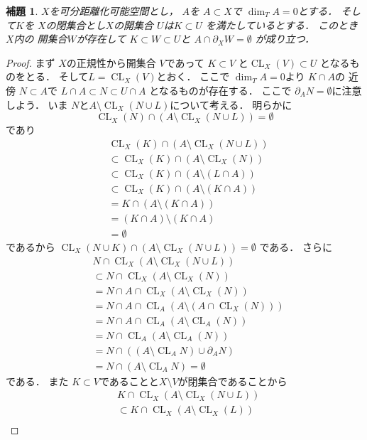 \documentclass[leqno, a4paper, 12pt]{jsarticle}
\newtheorem{lem}[thm]{補題}
\DeclareMathOperator{\cl}{CL}
\numberwithin{equation}{section}
\begin{document}
\begin{lem}\label{lem:jojo111}
$X$を可分距離化可能空間とし，
$A$を
$A\subset X$で
$\dim_{T}A=0$とする．
そして$K$を
$X$の閉集合とし$X$の開集合
$U$は$K\subset U$
を満たしているとする．
このとき$X$内の
開集合$W$が存在して
$K\subset W\subset U$と
$A\cap \partial_{X} W=\emptyset$
が成り立つ．
\end{lem}
\begin{proof}
まず
$X$の正規性から開集合
$V$であって
$K\subset V$
と$\cl_{X}(V)\subset U$
となるものをとる．
そして$L=\cl_{X}(V)$とおく．
ここで
$\dim_{T}A=0$より
$K\cap A$の
近傍
$N\subset A$で
$L\cap A\subset N\subset U\cap A$
となるものが存在する．
ここで
$\partial_{A}N=\emptyset$に注意しよう．
いま
$N$と$A\setminus \cl_{X}(N\cup L)$について考える．
明らかに
\[
\cl_{X}(N)\cap (A\setminus \cl_{X}(N\cup L))=\emptyset
\]
であり
\begin{align*}
&\cl_{X}(K)\cap (A\setminus \cl_{X}(N\cup L))\\
&\subset
\cl_{X}(K)\cap (A\setminus \cl_{X}(N))
 \\
&\subset \cl_{X}(K)\cap (A\setminus (L\cap A))\\
&\subset \cl_{X}(K)\cap(A\setminus (K\cap A))\\
&=K\cap (A\setminus (K\cap A))\\
&=(K\cap A)\setminus (K\cap A)\\
&=\emptyset
\end{align*}
であるから
$\cl_{X}(N\cup K)\cap (A\setminus \cl_{X}(N\cup L))=\emptyset$
である．
さらに
\begin{align*}
&N\cap 
\cl_{X}(A\setminus \cl_{X}(N\cup L))\\
&\subset N\cap 
\cl_{X}(A\setminus \cl_{X}(N))\\
&=
N \cap A\cap \cl_{X}(A\setminus \cl_{X}(N))
\\
&=
N\cap A\cap \cl_{A}(A\setminus (A\cap \cl_{X}(N)))
\\
&=
N\cap 
A\cap \cl_{A}(A\setminus \cl_{A}(N))\\
&=
N\cap 
\cl_{A}(A\setminus \cl_{A}(N))
\\
&=
N\cap (
(A\setminus \cl_{A} N)\cup \partial_{A} N)
\\
&=
N\cap (A\setminus \cl_{A} N)=\emptyset
\end{align*}
である．
また
$K\subset V$であることと$X\setminus V$が閉集合であることから
\begin{align*}
&K\cap 
\cl_{X}(A\setminus \cl_{X}(N\cup L))\\
&\subset K\cap \cl_{X}(A\setminus \cl_{X}(L))\\

\end{align*}
\end{proof}
\end{document}
